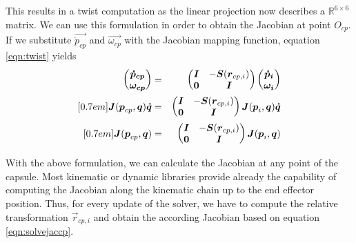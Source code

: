This results in a twist computation as the linear projection now describes a $\mathbb{R}^{6\times6}$ matrix. We can use this formulation in order to obtain the Jacobian at point $O_{cp}$. If we substitute $\vec{\dot{p}_{cp}}$ and $\vec{\omega_{cp}}$ with the Jacobian mapping function, equation \ref{eqn:twist} yields
\begin{eqnarray}
\begin{pmatrix}
\vec{\dot{p}_{cp}} \\
\vec{\omega_{cp}}
\end{pmatrix}  &=& 
\begin{pmatrix}
\vec{I} & -\vec{S}(\vec{r}_{cp,i}) \\
\vec{0} & \vec{I}
\end{pmatrix} 
\begin{pmatrix}
\vec{\dot{p}_{i}} \\
\vec{\omega_{i}}
\end{pmatrix} \notag \\ [0.7em]
\vec{J}(\vec{p}_{cp},\vec{q})\vec{\dot{q}} &=& 
\begin{pmatrix}
\vec{I} & -\vec{S}(\vec{r}_{cp,i}) \\
\vec{0} & \vec{I}
\end{pmatrix} 
\vec{J}(\vec{p}_{i},\vec{q})\vec{\dot{q}}
\notag \\ [0.7em]
\vec{J}(\vec{p}_{cp},\vec{q}) &=& 
\begin{pmatrix}
\vec{I} & -\vec{S}(\vec{r}_{cp,i}) \\
\vec{0} & \vec{I}
\end{pmatrix} 
\vec{J}(\vec{p}_{i},\vec{q}) \label{eqn:solvejaccp}
\end{eqnarray}

With the above formulation, we can calculate the Jacobian at any point of the capsule. Most kinematic or dynamic libraries provide already the capability of computing the Jacobian along the kinematic chain up to the end effector position. Thus, for every update of the solver, we have to compute the relative transformation $\vec{r}_{cp,i}$ and obtain the according Jacobian based on equation \ref{eqn:solvejaccp}. 
